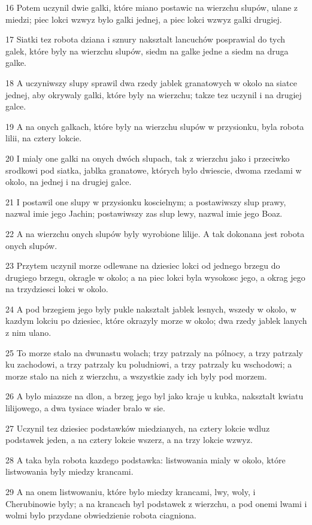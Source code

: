 \par 16 Potem uczynil dwie galki, które miano postawic na wierzchu slupów, ulane z miedzi; piec lokci wzwyz bylo galki jednej, a piec lokci wzwyz galki drugiej.
\par 17 Siatki tez robota dziana i sznury naksztalt lancuchów posprawial do tych galek, które byly na wierzchu slupów, siedm na galke jedne a siedm na druga galke.
\par 18 A uczyniwszy slupy sprawil dwa rzedy jablek granatowych w okolo na siatce jednej, aby okrywaly galki, które byly na wierzchu; takze tez uczynil i na drugiej galce.
\par 19 A na onych galkach, które byly na wierzchu slupów w przysionku, byla robota lilii, na cztery lokcie.
\par 20 I mialy one galki na onych dwóch slupach, tak z wierzchu jako i przeciwko srodkowi pod siatka, jablka granatowe, których bylo dwiescie, dwoma rzedami w okolo, na jednej i na drugiej galce.
\par 21 I postawil one slupy w przysionku koscielnym; a postawiwszy slup prawy, nazwal imie jego Jachin; postawiwszy zas slup lewy, nazwal imie jego Boaz.
\par 22 A na wierzchu onych slupów byly wyrobione lilije. A tak dokonana jest robota onych slupów.
\par 23 Przytem uczynil morze odlewane na dziesiec lokci od jednego brzegu do drugiego brzegu, okragle w okolo; a na piec lokci byla wysokosc jego, a okrag jego na trzydziesci lokci w okolo.
\par 24 A pod brzegiem jego byly pukle naksztalt jablek lesnych, wszedy w okolo, w kazdym lokciu po dziesiec, które okrazyly morze w okolo; dwa rzedy jablek lanych z nim ulano.
\par 25 To morze stalo na dwunastu wolach; trzy patrzaly na pólnocy, a trzy patrzaly ku zachodowi, a trzy patrzaly ku poludniowi, a trzy patrzaly ku wschodowi; a morze stalo na nich z wierzchu, a wszystkie zady ich byly pod morzem.
\par 26 A bylo miazsze na dlon, a brzeg jego byl jako kraje u kubka, naksztalt kwiatu lilijowego, a dwa tysiace wiader bralo w sie.
\par 27 Uczynil tez dziesiec podstawków miedzianych, na cztery lokcie wdluz podstawek jeden, a na cztery lokcie wszerz, a na trzy lokcie wzwyz.
\par 28 A taka byla robota kazdego podstawka: listwowania mialy w okolo, które listwowania byly miedzy krancami.
\par 29 A na onem listwowaniu, które bylo miedzy krancami, lwy, woly, i Cherubinowie byly; a na krancach byl podstawek z wierzchu, a pod onemi lwami i wolmi bylo przydane obwiedzienie robota ciagniona.
